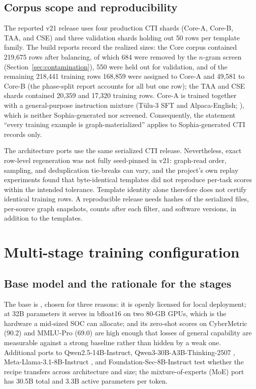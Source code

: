 \documentclass[preprint,12pt,authoryear]{elsarticle}
\newcommand{\code}[1]{\path{#1}}
\begin{document}
\subsection{Corpus scope and reproducibility}
The reported v21 release uses four production CTI shards (Core-A, Core-B, TAA, and CSE) and three validation shards holding out 50 rows per template family. The build reports record the realized sizes: the Core corpus contained 219,675 rows after balancing, of which 684 were removed by the $n$-gram screen (Section~\ref{sec:contamination}), 550 were held out for validation, and of the remaining 218,441 training rows 168,859 were assigned to Core-A and 49,581 to Core-B (the phase-split report accounts for all but one row); the TAA and CSE shards contained 20,359 and 17,320 training rows. Core-A is trained together with a general-purpose instruction mixture (T\"ulu-3 SFT and Alpaca-English; \citealp{lambert2024tulu3,taori2023alpaca}), which is neither Sophia-generated nor screened. Consequently, the statement ``every training example is graph-materialized'' applies to Sophia-generated CTI records only.

The architecture ports use the same serialized CTI release. Nevertheless, exact row-level regeneration was not fully seed-pinned in v21: graph-read order, sampling, and deduplication tie-breaks can vary, and the project's own replay experiments found that byte-identical templates did not reproduce per-task scores within the intended tolerance. Template identity alone therefore does not certify identical training rows. A reproducible release needs hashes of the serialized files, per-source graph snapshots, counts after each filter, and software versions, in addition to the templates.

\section{Multi-stage training configuration}\label{sec:training}
\subsection{Base model and the rationale for the stages}
The base is \code{Qwen/Qwen2.5-32B-Instruct} \citep{qwen2025qwen25}, chosen for three reasons: it is openly licensed for local deployment; at 32B parameters it serves in bfloat16 on two 80-GB GPUs, which is the hardware a mid-sized SOC can allocate; and its zero-shot scores on CyberMetric (90.2) and MMLU-Pro (69.0) are high enough that losses of general capability are measurable against a strong baseline rather than hidden by a weak one. Additional ports to Qwen2.5-14B-Instruct, Qwen3-30B-A3B-Thinking-2507 \citep{yang2025qwen3}, Meta-Llama-3.1-8B-Instruct \citep{grattafiori2024llama3}, and Foundation-Sec-8B-Instruct \citep{kassianik2025foundationsec} test whether the recipe transfers across architecture and size; the mixture-of-experts (MoE) port has 30.5B total and 3.3B active parameters per token.
\end{document}
